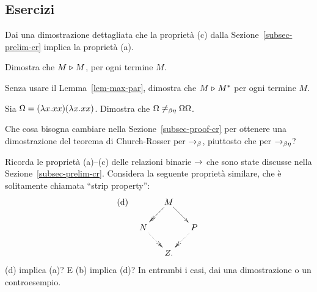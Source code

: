 \documentclass{article}
\begin{document}
\subsection{Esercizi}

\begin{exercise}
  Dai una dimostrazione dettagliata che la propriet\`a (c) dalla
  Sezione~\ref{subsec-prelim-cr} implica la propriet\`a (a).
\end{exercise}

\begin{exercise}
  Dimostra che $M\mathrel{\triangleright} M$, per ogni termine $M$.
\end{exercise}

\begin{exercise}
  Senza usare il Lemma~\ref{lem-max-par}, dimostra che $M\mathrel{\triangleright} M^*$ per
  ogni termine $M$.
\end{exercise}

\begin{exercise}
  Sia $\Omega=(\lambda x.xx)(\lambda x.xx)$. Dimostra che
  $\Omega\not=_{\beta\eta}\Omega\Omega$.
\end{exercise}

\begin{exercise}
  Che cosa bisogna cambiare nella Sezione~\ref{subsec-proof-cr} per ottenere
  una dimostrazione del teorema di Church-Rosser per $\rightarrow_{\beta}$, piuttosto che per
  $\rightarrow_{\beta\eta}$?
\end{exercise}

\begin{exercise}
  Ricorda le propriet\`a (a)--(c) delle relazioni binarie $\rightarrow$ che sono
  state discusse nella Sezione~\ref{subsec-prelim-cr}. Considera la seguente
  propriet\`a similare, che \`e solitamente chiamata ``strip property'':
  \[ \mbox{(d)} \ssep \xymatrix@dr{M\ar@{->}[r]\ar@{->>}[d] & P\ar@{.>>}[d]\\ N\ar@{.>>}[r] & Z.}
  \]
  (d) implica (a)? E (b) implica (d)? In entrambi i casi, dai una
  dimostrazione o un controesempio.
\end{exercise}
\end{document}
